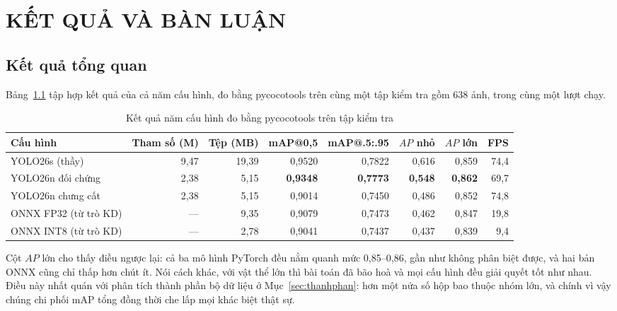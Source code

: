 \chapter{KẾT QUẢ VÀ BÀN LUẬN}
\label{ch:ket_qua}

\section{Kết quả tổng quan}

Bảng~\ref{tab:tongquan} tập hợp kết quả của cả năm cấu hình, đo bằng pycocotools trên cùng một tập
kiểm tra gồm 638 ảnh, trong cùng một lượt chạy.

\begin{table}[H]
\centering
\caption{Kết quả năm cấu hình đo bằng pycocotools trên tập kiểm tra}
\label{tab:tongquan}
\footnotesize
\begin{tabular}{lrrrrrrr}
\toprule
\textbf{Cấu hình} & \textbf{Tham số (M)} & \textbf{Tệp (MB)} & \textbf{mAP@0,5} & \textbf{mAP@.5:.95} & \textbf{$AP$ nhỏ} & \textbf{$AP$ lớn} & \textbf{FPS} \\
\midrule
YOLO26s (thầy)        & 9,47 & 19,39 & 0,9520 & 0,7822 & 0,616 & 0,859 & 74,4 \\
YOLO26n đối chứng     & 2,38 & 5,15  & \textbf{0,9348} & \textbf{0,7773} & \textbf{0,548} & \textbf{0,862} & 69,7 \\
YOLO26n chưng cất     & 2,38 & 5,15  & 0,9014 & 0,7450 & 0,486 & 0,852 & 74,8 \\
\midrule
ONNX FP32 (từ trò KD) & ---  & 9,35  & 0,9079 & 0,7473 & 0,462 & 0,847 & 19,8 \\
ONNX INT8 (từ trò KD) & ---  & 2,78  & 0,9041 & 0,7437 & 0,437 & 0,839 & 9,4 \\
\bottomrule
\end{tabular}
\end{table}


Cột $AP$ lớn cho thấy điều ngược lại: cả ba mô hình PyTorch đều nằm quanh mức 0,85--0,86, gần như
không phân biệt được, và hai bản ONNX cũng chỉ thấp hơn chút ít. Nói cách khác, với vật thể lớn thì
bài toán đã bão hoà và mọi cấu hình đều giải quyết tốt như nhau. Điều này nhất quán với phân tích
thành phần bộ dữ liệu ở Mục~\ref{sec:thanhphan}: hơn một nửa số hộp bao thuộc nhóm lớn, và chính vì
vậy chúng chi phối mAP tổng đồng thời che lấp mọi khác biệt thật sự.

